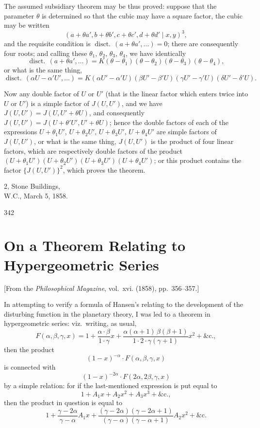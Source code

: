\documentclass[11pt,a4paper]{article}
\theoremstyle{plain}
\begin{document}
The assumed subsidiary theorem may be thus proved: suppose that the parameter $\theta$ is determined so that the cubic may have a square factor, the cubic may be written
\[
(a + \theta a', b + \theta b', c + \theta c', d + \theta d' \mid x, y)^3,
\]
and the requisite condition is $\operatorname{disct.}\,(a + \theta a', \ldots) = 0$; there are consequently four roots; and calling these $\theta_1$, $\theta_2$, $\theta_3$, $\theta_4$, we have identically
\[
\operatorname{disct.}\,(a + \theta a', \ldots) = K(\theta - \theta_1)(\theta - \theta_2)(\theta - \theta_3)(\theta - \theta_4),
\]
or what is the same thing,
\[
\operatorname{disct.}\,(\alpha U - \alpha' U', \ldots) = K(\alpha U' - \alpha' U)(\beta U' - \beta' U)(\gamma U' - \gamma' U)(\delta U' - \delta' U).
\]

Now any double factor of $U$ or $U'$ (that is the linear factor which enters twice into $U$ or $U'$) is a simple factor of $J(U, U')$, and we have $J(U, U') = J(U, U' + \theta U)$, and consequently $J(U, U') = J(U + \theta' U', U' + \theta U)$; hence the double factors of each of the expressions $U + \theta_1 U'$, $U + \theta_2 U'$, $U + \theta_3 U'$, $U + \theta_4 U'$ are simple factors of $J(U, U')$, or what is the same thing, $J(U, U')$ is the product of four linear factors, which are respectively double factors of the product $(U + \theta_1 U')(U + \theta_2 U')(U + \theta_3 U')(U + \theta_4 U')$; or this product contains the factor $\{J(U, U')\}^2$, which proves the theorem.

\begin{flushright}
2, Stone Buildings,\\
W.C., March 5, 1858.
\end{flushright}
\hfill 342
\newpage


\section{On a Theorem Relating to Hypergeometric Series}
\label{sec:211}

[From the \textit{Philosophical Magazine}, vol.~xvi. (1858), pp.~356--357.]
\vspace{1em}

In attempting to verify a formula of Hansen's relating to the development of the disturbing function in the planetary theory, I was led to a theorem in hypergeometric series: viz.\ writing, as usual,
\[
F(\alpha, \beta, \gamma, x) = 1 + \frac{\alpha \cdot \beta}{1 \cdot \gamma}x + \frac{\alpha(\alpha+1)\,\beta(\beta+1)}{1 \cdot 2 \cdot \gamma(\gamma+1)}x^2 + \&\text{c.},
\]
then the product
\[
(1-x)^{-\alpha} \cdot F(\alpha, \beta, \gamma, x)
\]
is connected with
\[
(1-x)^{-2\alpha} \cdot F(2\alpha, 2\beta, \gamma, x)
\]
by a simple relation: for if the last-mentioned expression is put equal to
\[
1 + A_1 x + A_2 x^2 + A_3 x^3 + \&\text{c.},
\]
then the product in question is equal to
\[
1 + \frac{\gamma - 2\alpha}{\gamma - \alpha}A_1 x + \frac{(\gamma - 2\alpha)(\gamma - 2\alpha + 1)}{(\gamma - \alpha)(\gamma - \alpha + 1)}A_2 x^2 + \&\text{c.}
\]
\end{document}
